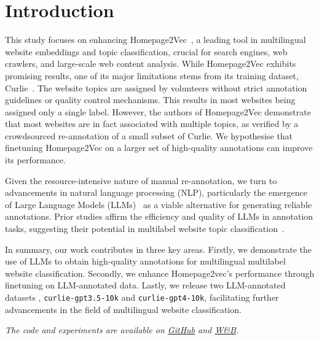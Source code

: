 \section{Introduction}

This study focuses on enhancing Homepage2Vec~\cite{homepage2vec}, a leading tool in multilingual website embeddings and topic classification, crucial for search engines, web crawlers, and large-scale web content analysis. While Homepage2Vec exhibits promising results, one of its major limitations stems from its training dataset, Curlie~\cite{curlie}. The website topics are assigned by volunteers without strict annotation guidelines or quality control mechanisms. This results in most websites being assigned only a single label. However, the authors of Homepage2Vec demonstrate that most websites are in fact associated with multiple topics, as verified by a crowdsourced re-annotation of a small subset of Curlie. We hypothesise that finetuning Homepage2Vec on a larger set of high-quality annotations can improve its performance.

Given the resource-intensive nature of manual re-annotation, we turn to advancements in natural language processing (NLP), particularly the emergence of Large Language Models (LLMs)~\cite{gpt3, gpt4} as a viable alternative for generating reliable annotations. Prior studies affirm the efficiency and quality of LLMs in annotation tasks, suggesting their potential in multilabel website topic classification~\cite{is-gpt3-good-annot,prompt-tuning,annollm,reduce-labeling-cost}.

In summary, our work contributes in three key areas. Firstly, we demonstrate the use of LLMs to obtain high-quality annotations for multilingual multilabel website classification. Secondly, we enhance Homepage2vec's performance through finetuning on LLM-annotated data. Lastly, we release two LLM-annotated datasets \cite{curlie-gpt-10k}, \texttt{curlie-gpt3.5-10k} and \texttt{curlie-gpt4-10k}, facilitating further advancements in the field of multilingual website classification.

\textit{The code and experiments are available on \href{https://github.com/CS-433/ml-project-2-mlp}{GitHub} and \href{https://wandb.ai/ml-project-2-mlp/homepage2vec}{W\&B}.}
